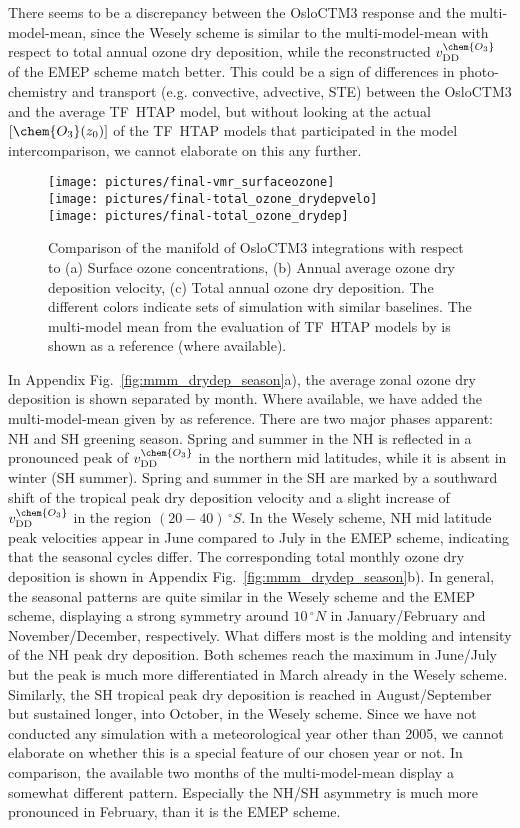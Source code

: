 \documentclass[gmd, manuscript]{copernicus}
\begin{document}
There seems to be a discrepancy between the OsloCTM3 response and the multi-model-mean, since the Wesely scheme is similar to the multi-model-mean with respect to total annual ozone dry deposition, while the reconstructed $v_\text{DD}^\chem{O_3}$ of the EMEP scheme match better. This could be a sign of differences in photo-chemistry and transport (e.g. convective, advective, STE) between the OsloCTM3 and the average TF~HTAP model, but without looking at the actual $[\chem{O_3}(z_0)]$ of the TF~HTAP models that participated in the model intercomparison, we cannot elaborate on this any further. 

\begin{figure}[t]
  \texttt{[image: pictures/final-vmr\_surfaceozone]}\\
  \texttt{[image: pictures/final-total\_ozone\_drydepvelo]}\\
  \texttt{[image: pictures/final-total\_ozone\_drydep]}
  \caption{Comparison of the manifold of OsloCTM3 integrations with respect to (a) Surface ozone concentrations, (b) Annual average ozone dry deposition velocity, (c) Total annual ozone dry deposition. The different colors indicate sets of simulation with similar baselines. The multi-model mean from the evaluation of TF~HTAP models by \citet{ACP:Hardacre2015} is shown as a reference (where available).}
  \label{fig:mmm_drydep}
\end{figure}
%
In Appendix Fig.~\ref{fig:mmm_drydep_season}a), the average zonal ozone dry deposition is shown separated by month. Where available, we have added the multi-model-mean given by \citet{ACP:Hardacre2015} as reference. There are two major phases apparent: NH and SH greening season. Spring and summer in the NH is reflected in a pronounced peak of $v_\text{DD}^\chem{O_3}$ in the northern mid latitudes, while it is absent in winter (SH summer). Spring and summer in the SH are marked by a southward shift of the tropical peak dry deposition velocity and a slight increase of $v_\text{DD}^\chem{O_3}$ in the region $(20-40)\,\unit{^\circ S}$. In the Wesely scheme, NH mid latitude peak velocities appear in June compared to July in the EMEP scheme, indicating that the seasonal cycles differ. The corresponding total monthly ozone dry deposition is shown in Appendix Fig.~\ref{fig:mmm_drydep_season}b). In general, the seasonal patterns are quite similar in the Wesely scheme and the EMEP scheme, displaying a strong symmetry around $10\,\unit{^\circ N}$ in January/February and November/December, respectively. What differs most is the molding and intensity of the NH peak dry deposition. Both schemes reach the maximum in June/July but the peak is much more differentiated in March already in the Wesely scheme. Similarly, the SH tropical peak dry deposition is reached in August/September but sustained longer, into October, in the Wesely scheme. Since we have not conducted any simulation with a meteorological year other than 2005, we cannot elaborate on whether this is a special feature of our chosen year or not. In comparison, the available two months of the multi-model-mean display a somewhat different pattern. Especially the NH/SH asymmetry is much more pronounced in February, than it is the EMEP scheme.
%
\end{document}
